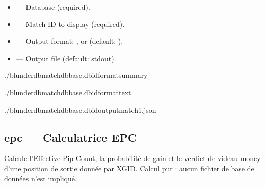 \documentclass[letterpaper,10pt,english]{sphinxmanual}
\begin{document}
\sphinxAtStartPar
{}
\begin{itemize}
\item {} 
\sphinxAtStartPar
{} — Database (required).

\item {} 
\sphinxAtStartPar
{} — Match ID to display (required).

\item {} 
\sphinxAtStartPar
{} — Output format: ,  or  (default: ).

\item {} 
\sphinxAtStartPar
{} — Output file (default: stdout).

\end{itemize}

\sphinxAtStartPar
{}

\begin{sphinxVerbatim}[commandchars=\\\{\}]
./blunderdbmatch\PYGZhy{}\PYGZhy{}dbbase.db\PYGZhy{}\PYGZhy{}id\PYGZhy{}\PYGZhy{}formatsummary

./blunderdbmatch\PYGZhy{}\PYGZhy{}dbbase.db\PYGZhy{}\PYGZhy{}id\PYGZhy{}\PYGZhy{}formattext

./blunderdbmatch\PYGZhy{}\PYGZhy{}dbbase.db\PYGZhy{}\PYGZhy{}id\PYGZhy{}\PYGZhy{}outputmatch1.json
\end{sphinxVerbatim}


\subsection{epc — Calculatrice EPC}
\label{\detokenize{cli:epc-calculatrice-epc}}
\sphinxAtStartPar
Calcule l’Effective Pip Count, la probabilité de gain et le verdict de videau
money d’une position de sortie donnée par XGID. Calcul pur : aucun fichier de
base de données n’est impliqué.
\end{document}

